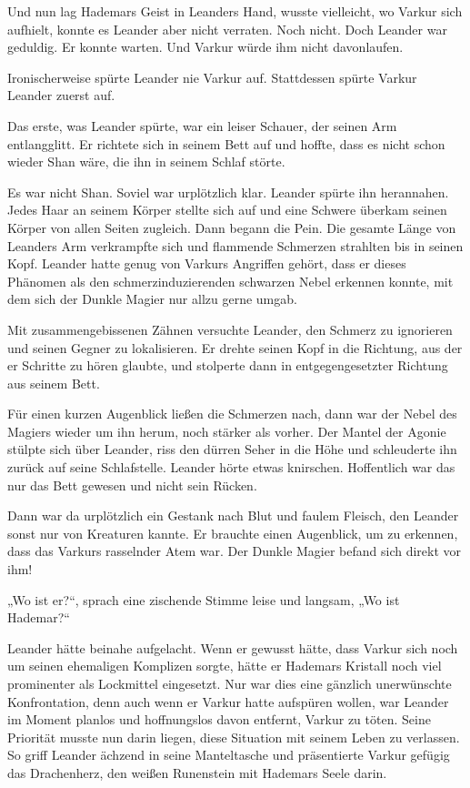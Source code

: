 \documentclass[10pt, a4paper, oneside]{book}
\begin{document}
Und nun lag Hademars Geist in Leanders Hand, wusste vielleicht, wo Varkur sich aufhielt, konnte es Leander aber nicht verraten. Noch nicht. Doch Leander war geduldig. Er konnte warten. Und Varkur würde ihm nicht davonlaufen.\bigskip







Ironischerweise spürte Leander nie Varkur auf. Stattdessen spürte Varkur Leander zuerst auf.

Das erste, was Leander spürte, war ein leiser Schauer, der seinen Arm entlangglitt. Er richtete sich in seinem Bett auf und hoffte, dass es nicht schon wieder Shan wäre, die ihn in seinem Schlaf störte.

Es war nicht Shan. Soviel war urplötzlich klar. Leander spürte ihn herannahen. Jedes Haar an seinem Körper stellte sich auf und eine Schwere überkam seinen Körper von allen Seiten zugleich. Dann begann die Pein. Die gesamte Länge von Leanders Arm verkrampfte sich und flammende Schmerzen strahlten bis in seinen Kopf. Leander hatte genug von Varkurs Angriffen gehört, dass er dieses Phänomen als den schmerzinduzierenden schwarzen Nebel erkennen konnte, mit dem sich der Dunkle Magier nur allzu gerne umgab.

Mit zusammengebissenen Zähnen versuchte Leander, den Schmerz zu ignorieren und seinen Gegner zu lokalisieren. Er drehte seinen Kopf in die Richtung, aus der er Schritte zu hören glaubte, und stolperte dann in entgegengesetzter Richtung aus seinem Bett.

Für einen kurzen Augenblick ließen die Schmerzen nach, dann war der Nebel des Magiers wieder um ihn herum, noch stärker als vorher. Der Mantel der Agonie stülpte sich über Leander, riss den dürren Seher in die Höhe und schleuderte ihn zurück auf seine Schlafstelle. Leander hörte etwas knirschen. Hoffentlich war das nur das Bett gewesen und nicht sein Rücken.

Dann war da urplötzlich ein Gestank nach Blut und faulem Fleisch, den Leander sonst nur von Kreaturen kannte. Er brauchte einen Augenblick, um zu erkennen, dass das Varkurs rasselnder Atem war. Der Dunkle Magier befand sich direkt vor ihm!

„Wo ist er?“, sprach eine zischende Stimme leise und langsam, „Wo ist Hademar?“

Leander hätte beinahe aufgelacht. Wenn er gewusst hätte, dass Varkur sich noch um seinen ehemaligen Komplizen sorgte, hätte er Hademars Kristall noch viel prominenter als Lockmittel eingesetzt. Nur war dies eine gänzlich unerwünschte Konfrontation, denn auch wenn er Varkur hatte aufspüren wollen, war Leander im Moment planlos und hoffnungslos davon entfernt, Varkur zu töten. Seine Priorität musste nun darin liegen, diese Situation mit seinem Leben zu verlassen. So griff Leander ächzend in seine Manteltasche und präsentierte Varkur gefügig das Drachenherz, den weißen Runenstein mit Hademars Seele darin.
\end{document}
